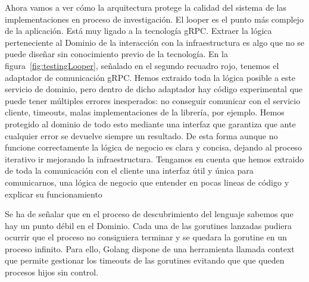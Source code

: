 Ahora vamos a ver cómo la arquitectura protege la calidad del sistema de las implementaciones en proceso de investigación.
El looper es el punto más complejo de la aplicación.
Está muy ligado a la tecnología gRPC. Extraer la lógica perteneciente al Dominio de la interacción con la infraestructura es algo que no se puede diseñar sin conocimiento previo de la tecnología.
En la figura~\cref{fig:testingLooper}, señalado en el segundo recuadro rojo, tenemos el adaptador de comunicación gRPC. Hemos extraido toda la lógica posible a este servicio de dominio, pero dentro de dicho adaptador hay código experimental que puede tener múltiples errores inesperados: no conseguir comunicar con el servicio cliente, timeouts, malas implementaciones de la librería, por ejemplo.
Hemos protegido al dominio de todo esto mediante una interfaz que garantiza que ante cualquier error se devuelve siempre un resultado.
De esta forma aunque no funcione correctamente la lógica de negocio es clara y concisa, dejando al proceso iterativo ir mejorando la infraestructura.
Tengamos en cuenta que hemos extraido de toda la comunicación con el cliente una interfaz útil y única para comunicarnos, una lógica de negocio que entender en pocas lineas de código y explicar su funcionamiento

Se ha de señalar que en el proceso de descubrimiento del lenguaje sabemos que hay un punto débil en el Dominio.
Cada una de las gorutines lanzadas pudiera ocurrir que el proceso no consiguiera terminar y se quedara la gorutine en un proceso infinito.
Para ello, Golang dispone de una herramienta llamada context que permite gestionar los timeouts de las gorutines evitando que que queden procesos hijos sin control.

